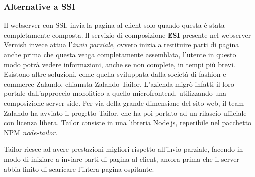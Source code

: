 \subsubsection{Alternative a SSI}
Il webserver con SSI, invia la pagina al client solo quando questa è stata completamente composta.
Il servizio di composizione \textbf{ESI} presente nel webserver Vernish invece attua l'\emph{invio parziale},
 ovvero inizia a restituire parti di pagina anche prima che questa venga completamente assemblata, 
 l'utente in questo modo potrà vedere informazioni, anche se non complete, in tempi più brevi.
\\
Esistono altre soluzioni, come quella sviluppata dalla società di fashion e-commerce Zalando, chiamata Zalando Tailor.
L'azienda migrò infatti il loro portale dall'approccio monolitico a quello microfrontend, utilizzando una composizione
server-side. Per via della grande dimensione del sito web, il team Zalando ha avviato il progetto Tailor, che ha poi portato ad un rilascio 
ufficiale con licenza libera. Tailor consiste in una libreria Node.js, reperibile nel pacchetto NPM \emph{node-tailor}.

Tailor riesce ad avere prestazioni migliori rispetto all'invio parziale, facendo in modo di iniziare a inviare parti di pagina al client,
ancora prima che il server abbia finito di scaricare l'intera pagina ospitante.

\pagebreak
